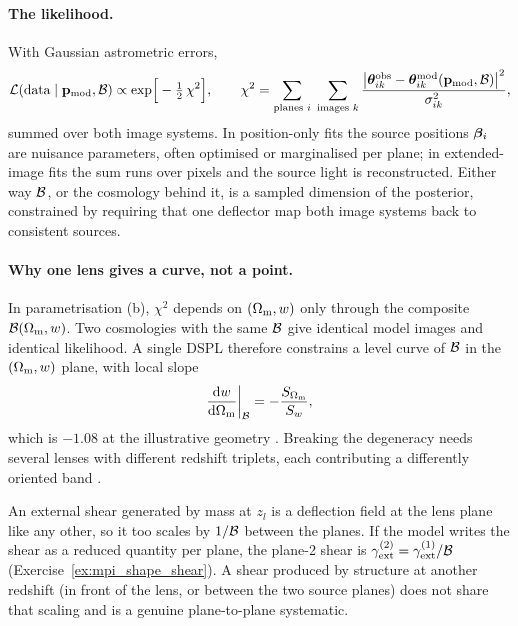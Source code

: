 \paragraph{The likelihood.}  With Gaussian astrometric errors,
\begin{equation}
  \mathcal{L}(\text{data}\mid\mathbf{p}_{\rm mod},\mathcal{B})\propto
  \exp\!\Big[-\tfrac12\,\chi^2\Big],\qquad
  \chi^2 = \sum_{\text{planes }i}\;\sum_{\text{images }k}
  \frac{\big|\boldsymbol{\theta}^{\rm obs}_{ik}-\boldsymbol{\theta}^{\rm mod}_{ik}(\mathbf{p}_{\rm mod},\mathcal{B})\big|^2}{\sigma^2_{ik}},
  \label{eq:mpi_like}
\end{equation}
summed over both image systems.  In position-only fits the source
positions $\boldsymbol{\beta}_i$ are nuisance parameters, often optimised or
marginalised per plane; in extended-image fits the sum runs over pixels
and the source light is reconstructed.  Either way $\mathcal{B}$, or the
cosmology behind it, is a sampled dimension of the posterior,
constrained by requiring that one deflector map both image systems back
to consistent sources.

\paragraph{Why one lens gives a curve, not a point.}  In
parametrisation (b), $\chi^2$ depends on $(\Omega_{\mathrm{m}},w)$ only through the
composite $\mathcal{B}(\Omega_{\mathrm{m}},w)$.  Two cosmologies with the same $\mathcal{B}$ give
identical model images and identical likelihood.  A single DSPL
therefore constrains a level curve of $\mathcal{B}$ in the $(\Omega_{\mathrm{m}},w)$
plane, with local slope
\begin{equation}
  \frac{\mathrm{d} w}{\mathrm{d} \Omega_{\mathrm{m}}}\bigg|_{\mathcal{B}}=-\frac{S_{\Omega_{\mathrm{m}}}}{S_w},
  \label{eq:mpi_degslope}
\end{equation}
which is $-1.08$ at the illustrative geometry .  Breaking the degeneracy needs several lenses with different
redshift triplets, each contributing a differently oriented band
\citep{collett_2012}.  

\begin{annotation}
An external shear generated by mass at $z_l$ is a deflection field at
the lens plane like any other, so it too scales by $1/\mathcal{B}$ between the
planes.  If the model writes the shear as a reduced quantity per plane,
the plane-2 shear is $\gamma_{\rm ext}^{(2)}=\gamma_{\rm ext}^{(1)}/\mathcal{B}$
(Exercise~\ref{ex:mpi_shape_shear}).  A shear produced by structure at
another redshift (in front of the lens, or between the two
source planes) does not share that scaling and is a genuine
plane-to-plane systematic.
\end{annotation}


